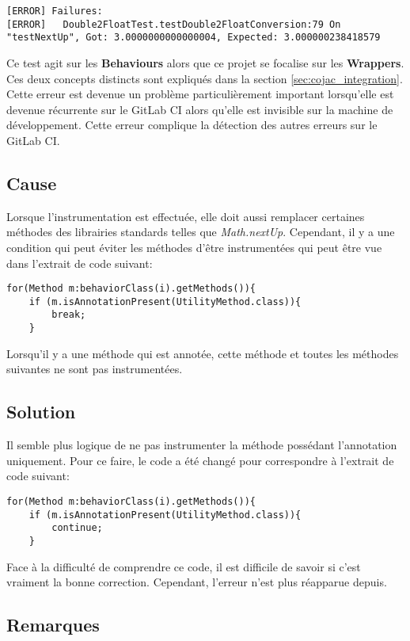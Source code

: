 \begin{verbatim}
[ERROR] Failures: 
[ERROR]   Double2FloatTest.testDouble2FloatConversion:79 On "testNextUp", Got: 3.0000000000000004, Expected: 3.000000238418579
\end{verbatim}

Ce test agit sur les \textbf{\glspl{Behaviour}} alors que ce projet se focalise sur les \textbf{\glspl{Wrapper}}. Ces deux concepts distincts sont expliqués dans la section \ref{sec:cojac_integration}. Cette erreur est devenue un problème particulièrement important lorsqu'elle est devenue récurrente sur le GitLab CI alors qu'elle est invisible sur la machine de développement. Cette erreur complique la détection des autres erreurs sur le GitLab CI.

\subsection{Cause}

Lorsque l'instrumentation est effectuée, elle doit aussi remplacer certaines méthodes des librairies standards telles que \textit{Math.nextUp}. Cependant, il y a une condition qui peut éviter les méthodes d'être instrumentées qui peut être vue dans l'extrait de code suivant:
\begin{verbatim}
for(Method m:behaviorClass(i).getMethods()){
    if (m.isAnnotationPresent(UtilityMethod.class)){
        break;
    }
\end{verbatim}
Lorsqu'il y a une méthode qui est annotée, cette méthode et toutes les méthodes suivantes ne sont pas instrumentées.

\subsection{Solution}

Il semble plus logique de ne pas instrumenter la méthode possédant l'annotation uniquement. Pour ce faire, le code a été changé pour correspondre à l'extrait de code suivant:
\begin{verbatim}
for(Method m:behaviorClass(i).getMethods()){
    if (m.isAnnotationPresent(UtilityMethod.class)){
        continue;
    }
\end{verbatim}

Face à la difficulté de comprendre ce code, il est difficile de savoir si c'est vraiment la bonne correction. Cependant, l'erreur n'est plus réapparue depuis.

\subsection{Remarques}

